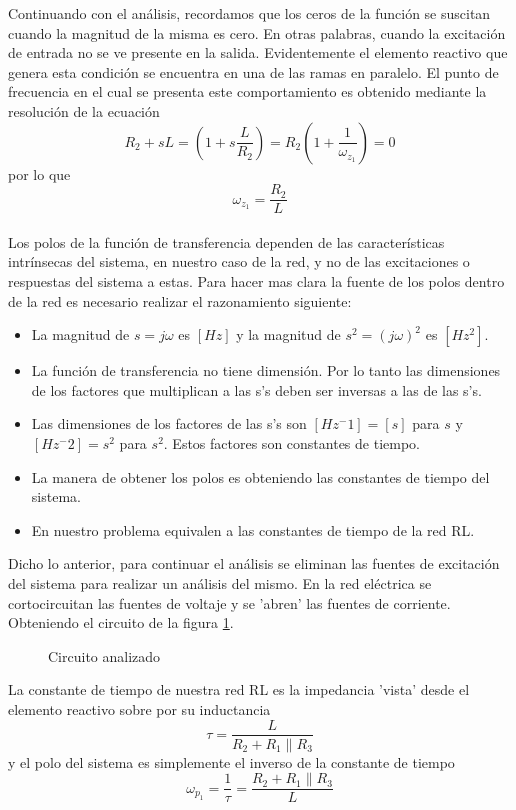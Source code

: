 \documentclass[letterpaper,11pt]{article}
\newcommand{\unidad}[1]{\,\si{#1}}
\begin{document}
		Continuando con el análisis, recordamos que los ceros de la función se suscitan cuando la magnitud de la misma es cero. En otras palabras, cuando la excitación de entrada no se ve presente en la salida. Evidentemente el elemento reactivo que genera esta condición se encuentra en una de las ramas en paralelo. El punto de frecuencia en el cual se presenta este comportamiento es obtenido mediante la resolución de la ecuación
		\[ R_2 + sL  = \left(1 + s\frac{L}{R_2}\right) = R_2 \left( 1 + \frac{1}{\omega_{z_1}} \right) = 0\]
		por lo que
		\[ \omega_{z_1} = \frac{R_2}{L}\]
		\\
		Los polos de la función de transferencia dependen de las características intrínsecas del sistema, en nuestro caso de la red, y no de las excitaciones o respuestas del sistema a estas. Para hacer mas clara la fuente de los polos dentro de la red es necesario realizar el razonamiento siguiente:
		\begin{tcolorbox}
			\begin{itemize}
				\item La magnitud de $s = j \omega$ es $\left[Hz\right]$ y la magnitud de $s^2 = \left(j \omega\right)^2$ es $\left[Hz^2\right]$.
				\item La función de transferencia no tiene dimensión. Por lo tanto las dimensiones de los factores que multiplican a las s's deben ser inversas a las de las s's. 
				\item Las dimensiones de los factores de las s's son $[Hz^-1] = [s]$ para $s$ y $[Hz^-2] = s^2$ para $s^2$. Estos factores son constantes de tiempo.
				\item La manera de obtener los polos es obteniendo las constantes de tiempo del sistema.
				\item En nuestro problema equivalen a las constantes de tiempo de la red RL.
			\end{itemize}
		\end{tcolorbox}
		Dicho lo anterior, para continuar el análisis se eliminan las fuentes de excitación del sistema para realizar un análisis del mismo. En la red eléctrica se cortocircuitan las fuentes de voltaje y se 'abren' las fuentes de corriente. Obteniendo el circuito de la figura \ref{cir:hpf_pole_inspection}.\\
				\begin{figure}[h!]
					\centering
					\caption{Circuito analizado}
					\label{cir:hpf_pole_inspection}
				\end{figure}
		La constante de tiempo de nuestra red RL es la impedancia 'vista' desde el elemento reactivo sobre por su inductancia 
		\[ \tau=  \frac {L}{ R_2 + R_1 \parallel R_3} \]
		y el polo del sistema es simplemente el inverso de la constante de tiempo
		\[\omega_{p_1} = \frac{1}{\tau} = \frac {R_2 + R_1 \parallel R_3}{L} \]
	
\end{document}
